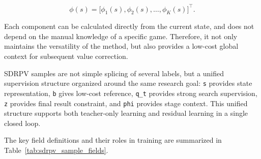 \begin{equation}
\phi(s)=\bigl[\phi_1(s),\phi_2(s),\ldots,\phi_K(s)\bigr]^\top.
\end{equation}

Each component can be calculated directly from the current state, and does not depend on the manual knowledge of a specific game. Therefore, it not only maintains the versatility of the method, but also provides a low-cost global context for subsequent value correction.


SDRPV samples are not simple splicing of several labels, but a unified supervision structure organized around the same research goal: \texttt{s} provides state representation, \texttt{b} gives low-cost reference, \texttt{q_t} provides strong search supervision, \texttt{z} provides final result constraint, and \texttt{phi} provides stage context. This unified structure supports both teacher-only learning and residual learning in a single closed loop.

The key field definitions and their roles in training are summarized in Table~\ref{tab:sdrpv_sample_fields}.



